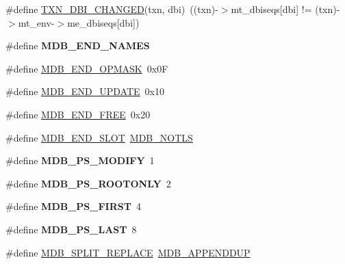 \begin{DoxyCompactItemize}
\item 
\#define \mbox{\hyperlink{group__internal_ga1d4c1bd5bcb0a3cf8d281fa4868d5b8d}{T\+X\+N\+\_\+\+D\+B\+I\+\_\+\+C\+H\+A\+N\+G\+ED}}(txn,  dbi)~((txn)-\/$>$mt\+\_\+dbiseqs\mbox{[}dbi\mbox{]} != (txn)-\/$>$mt\+\_\+env-\/$>$me\+\_\+dbiseqs\mbox{[}dbi\mbox{]})
\item 
\#define {\bfseries M\+D\+B\+\_\+\+E\+N\+D\+\_\+\+N\+A\+M\+ES}
\item 
\#define \mbox{\hyperlink{group__internal_ga434fb0a8bf7aa2d75480433ecfe83cc8}{M\+D\+B\+\_\+\+E\+N\+D\+\_\+\+O\+P\+M\+A\+SK}}~0x0F
\item 
\#define \mbox{\hyperlink{group__internal_ga2c5fdbe99b689b581138a007499cd79a}{M\+D\+B\+\_\+\+E\+N\+D\+\_\+\+U\+P\+D\+A\+TE}}~0x10
\item 
\#define \mbox{\hyperlink{group__internal_ga53b444549d2fd33ac11e2a137e8ec49c}{M\+D\+B\+\_\+\+E\+N\+D\+\_\+\+F\+R\+EE}}~0x20
\item 
\#define \mbox{\hyperlink{group__internal_gab6f1e210f86ed62e06cfa9accb48c7f2}{M\+D\+B\+\_\+\+E\+N\+D\+\_\+\+S\+L\+OT}}~\mbox{\hyperlink{group__mdb__env_ga5dca84a576d14b4bfe2deddc2dc622d3}{M\+D\+B\+\_\+\+N\+O\+T\+LS}}
\item 
\mbox{\label{group__internal_ga06e8b96ef77e8d1834b428a37f81b74c}} 
\#define {\bfseries M\+D\+B\+\_\+\+P\+S\+\_\+\+M\+O\+D\+I\+FY}~1
\item 
\mbox{\label{group__internal_ga78a7407a7f0ccd64d0ba907372f93e40}} 
\#define {\bfseries M\+D\+B\+\_\+\+P\+S\+\_\+\+R\+O\+O\+T\+O\+N\+LY}~2
\item 
\mbox{\label{group__internal_ga2c4075461ed0732c279cc876db3ca205}} 
\#define {\bfseries M\+D\+B\+\_\+\+P\+S\+\_\+\+F\+I\+R\+ST}~4
\item 
\mbox{\label{group__internal_gacab0d55e9ce5016ecfb17bd892557a33}} 
\#define {\bfseries M\+D\+B\+\_\+\+P\+S\+\_\+\+L\+A\+ST}~8
\item 
\#define \mbox{\hyperlink{group__internal_ga43ef6688956e10907bc4e1d6dbc2d946}{M\+D\+B\+\_\+\+S\+P\+L\+I\+T\+\_\+\+R\+E\+P\+L\+A\+CE}}~\mbox{\hyperlink{group__mdb__put_ga0583fe408057ff1c03b8dd071c0d68d2}{M\+D\+B\+\_\+\+A\+P\+P\+E\+N\+D\+D\+UP}}
\item 
\mbox{\label{group__internal_ga93c88511ba939d3bc1b47ce2cefb9607}} 

\end{DoxyCompactItemize}
